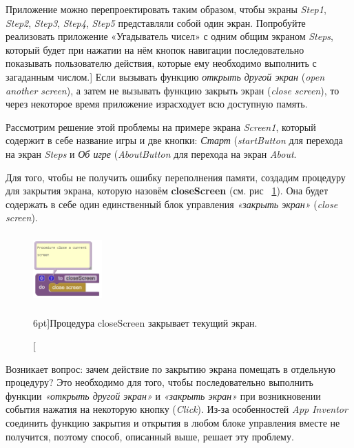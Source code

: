 \begin{mdfstyle}[nobreak=true,frametitle=Задание]
  \sloppy   
  Приложение можно перепроектировать таким образом, чтобы экраны \textit{Step1}, \textit{Step2}, \textit{Step3}, \textit{Step4}, \textit{Step5} представляли собой один экран. Попробуйте реализовать приложение «Угадыватель чисел» с одним общим экраном \textit{Steps}, который будет при нажатии на нём кнопок навигации последовательно показывать пользователю действия, которые ему необходимо выполнить с загаданным числом.]
  Если вызывать функцию \textit{открыть другой экран} (\textit{open another screen}), а затем не вызывать функцию закрыть экран (\textit{close screen}), то через некоторое время приложение израсходует всю доступную память.
  \end{mdfstyle}

Рассмотрим решение этой проблемы на примере экрана \textit{Screen1}, который содержит в себе название игры и две кнопки: \textit{Старт} (\textit{startButton} для перехода на экран \textit{Steps} и \textit{Об игре} (\textit{AboutButton} для перехода на экран \textit{About}.

Для того, чтобы не получить ошибку переполнения памяти, создадим процедуру для закрытия экрана, которую назовём \textbf{closeScreen} (см. рис ~\ref{fig:block:click:close:screen}). Она будет содержать в себе один единственный блок управления \textit{«закрыть экран»} (\textit{close screen}). 
\begin{figure}
  \includegraphics[width=100,height=100]{./graphics/programs/guess_numbers/procedure_closeScreen_AppInventor_2018.png}
    \caption[Процедура closeScreen.][6pt]{Процедура closeScreen закрывает текущий экран.}
  \label{fig:block:click:close:screen}
\end{figure}
Возникает вопрос: зачем действие по закрытию экрана помещать в отдельную процедуру? Это необходимо для того, чтобы последовательно выполнить функции \textit{«открыть другой экран»} и \textit{«закрыть экран»} при возникновении события нажатия на некоторую кнопку (\textit{Click}). Из-за особенностей \textit{App Inventor} соединить функцию закрытия и открытия в любом блоке управления вместе не получится, поэтому способ, описанный выше, решает эту проблему.

